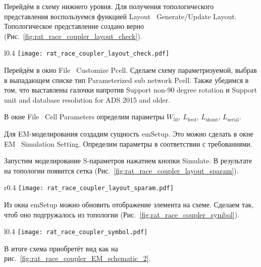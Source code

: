 Перейдём в схему нижнего уровня. Для получения топологического представления воспользуемся функцией Layout \textrightarrow\ Generate/Update Layout.
Топологическое представление создано верно (Рис.~\ref{fig:rat_race_coupler_layout_check}).

\begin{wrapfigure}{l}{0.4\textwidth}
    \centering
    \texttt{[image: rat\_race\_coupler\_layout\_check.pdf]}
    \caption{Проверка топологического представления}%
    \label{fig:rat_race_coupler_layout_check}
\end{wrapfigure}

Перейдём в окно File \textrightarrow\ Customize Pcell.
Сделаем схему параметризуемой, выбрав в выпадающем списке тип Parameterized sub network Pcell.
Также убедимся в том, что выставлены галочки напротив Support non-90 degree rotation и Support unit and database resolution for ADS 2015 and older.

В окне File \textrightarrow\ Cell Parameters определим параметры $W_{50}$, $L_\text{feed}$, $L_\text{shunt}$, $L_\text{serial}$.

Для EM-моделирования создадим сущность emSetup.
Это можно сделать в окне EM \textrightarrow\ Simulation Setting.
Определим параметры в соответствии с требованиями.

Запустим моделирование S-параметров нажатием кнопки Simulate.
В результате на топологии появится сетка (Рис.~\ref{fig:rat_race_coupler_layout_sparam}).

\begin{wrapfigure}{r}{0.4\textwidth}
    \centering
    \texttt{[image: rat\_race\_coupler\_layout\_sparam.pdf]}
    \caption{Сетка на топологическом представлении после проведения EM-моделирования}%
    \label{fig:rat_race_coupler_layout_sparam}
\end{wrapfigure}

Из окна emSetup можно обновить отображение элемента на схеме.
Сделаем так, чтоб оно подгружалось из топологии (Рис.~\ref{fig:rat_race_coupler_symbol}).

\begin{wrapfigure}{l}{0.4\textwidth}
    \centering
    \texttt{[image: rat\_race\_coupler\_symbol.pdf]}
    \caption{Обновлённый символ}%
    \label{fig:rat_race_coupler_symbol}
\end{wrapfigure}

В итоге схема приобретёт вид как на рис.~\ref{fig:rat_race_coupler_EM_schematic_2}.


